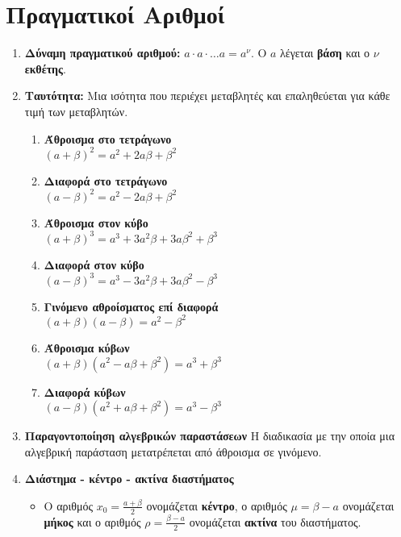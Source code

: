 \documentclass[twoside,nofonts,internet,shmeiwseis]{thewria}
\begin{document}
\section{Πραγματικοί Αριθμοί}
\begin{enumerate}
\item \textbf{Δύναμη πραγματικού αριθμού:} $ a\cdot a\cdot\ldots a=a^\nu $. Ο $ a $ λέγεται \textbf{βάση} και ο $ \nu $ \textbf{εκθέτης}.
\item \textbf{Ταυτότητα:} Μια ισότητα που περιέχει μεταβλητές και επαληθεύεται για κάθε τιμή των μεταβλητών.
\begin{multicols}{2}
\begin{enumerate}[itemsep=0mm,label=\bf\arabic*.]
\item \parbox[t]{7cm}{\textbf{Άθροισμα στο τετράγωνο}\\$ (a+\beta)^2=a^2+2a\beta+\beta^2 $}
\item \parbox[t]{7cm}{\textbf{Διαφορά στο τετράγωνο}\\$ (a-\beta)^2=a^2-2a\beta+\beta^2 $}
\item \parbox[t]{7cm}{\textbf{Άθροισμα στον κύβο}\\$ (a+\beta)^3=a^3+3a^2\beta+3a\beta^2+\beta^3 $}
\item \parbox[t]{7cm}{\textbf{Διαφορά στον κύβο}\\$ (a-\beta)^3=a^3-3a^2\beta+3a\beta^2-\beta^3 $}
\item \parbox[t]{7cm}{\textbf{Γινόμενο αθροίσματος επί διαφορά}\\$ (a+\beta)(a-\beta)=a^2-\beta^2 $}
\item \parbox[t]{7cm}{\textbf{Άθροισμα κύβων}\\$ (a+\beta)\left(a^2-a\beta+\beta^2 \right)=a^3+\beta^3 $}
\item \parbox[t]{7cm}{\textbf{Διαφορά κύβων}\\$ (a-\beta)\left(a^2+a\beta+\beta^2 \right)=a^3-\beta^3 $}
\end{enumerate}
\end{multicols}
\item \textbf{Παραγοντοποίηση αλγεβρικών παραστάσεων}
Η διαδικασία με την οποία μια αλγεβρική παράσταση μετατρέπεται από άθροισμα σε γινόμενο.
\item \textbf{Διάστημα - κέντρο - ακτίνα διαστήματος}
\begin{itemize}[itemsep=0mm]
\item Ο αριθμός $ x_0=\frac{a+\beta}{2} $ ονομάζεται \textbf{κέντρο}, ο αριθμός $ \mu=\beta-a $ ονομάζεται \textbf{μήκος} και ο αριθμός $ \rho=\frac{\beta-a}{2} $ ονομάζεται \textbf{ακτίνα} του διαστήματος.

\end{itemize}
\end{enumerate}
\end{document}
